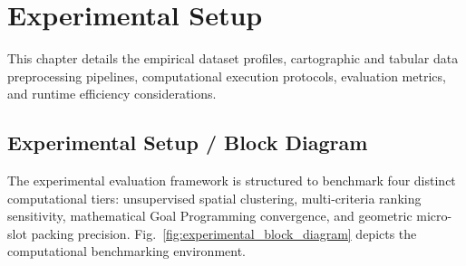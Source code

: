 \chapter{Experimental Setup}
\label{ch:experimental_setup}

This chapter details the empirical dataset profiles, cartographic and tabular data preprocessing pipelines, computational execution protocols, evaluation metrics, and runtime efficiency considerations.

\section{Experimental Setup / Block Diagram}
\label{sec:setup_block_diagram}

The experimental evaluation framework is structured to benchmark four distinct computational tiers: unsupervised spatial clustering, multi-criteria ranking sensitivity, mathematical Goal Programming convergence, and geometric micro-slot packing precision. Fig.~\ref{fig:experimental_block_diagram} depicts the computational benchmarking environment.

